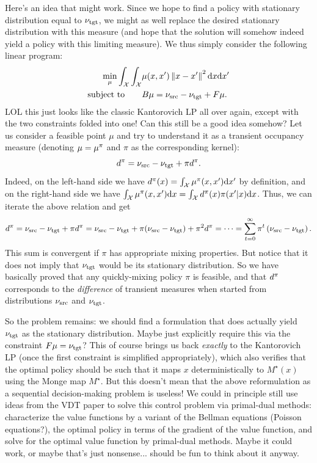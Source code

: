 \documentclass[twoside,10pt]{jmlr}
\begin{document}
Here's an idea that might work. Since we hope to find a policy with stationary distribution equal to $\nu_{\text{tgt}}$, we might 
as well replace the desired stationary distribution with this measure (and hope that the solution will somehow indeed 
yield a policy with this limiting measure). We thus simply consider the following linear program:
\begin{align*}
 \min_{\mu} \int_{\mathcal{X}} \int_{\mathcal{X}} &\mu(x,x') \left\lVert x-x'\right\rVert^2 \mathrm{d} x \mathrm{d} x'
 \\
 \mbox{subject to} \qquad & B\mu = \nu_{\text{src}} - \nu_{\text{tgt}} + F\mu.
\end{align*}
LOL this just looks like the classic Kantorovich LP all over again, except with the two constraints folded into one! 
Can this still be a good idea somehow? Let us consider a feasible point $\mu$ and try to understand it as a transient 
occupancy measure (denoting $\mu = \mu^\pi$ and $\pi$ as the corresponding kernel):
\[
 d^\pi = \nu_{\text{src}} - \nu_{\text{tgt}} + \pi d^\pi.
\]
Indeed, on the left-hand side we have $d^\pi(x) = \int_{\mathcal{X}} \mu^\pi(x,x') \mathrm{d} x'$ by definition, and on the right-hand 
side we have $\int_{\mathcal{X}} \mu^\pi(x,x') \mathrm{d} x = \int_{\mathcal{X}} d^\pi(x) \pi(x'|x) \mathrm{d} x$. Thus, we can iterate the above relation 
and get
\[
 d^\pi = \nu_{\text{src}} - \nu_{\text{tgt}} + \pi d^\pi = \nu_{\text{src}} - \nu_{\text{tgt}} + \pi(\nu_{\text{src}} - \nu_{\text{tgt}}) + \pi^2 d^\pi = \dots = \sum_{t=0}^\infty \pi^t\left(\nu_{\text{src}} - 
\nu_{\text{tgt}}\right).
\]
This sum is convergent if $\pi$ has appropriate mixing properties. But notice that it does not imply that $\nu_{\text{tgt}}$ would 
be its stationary distribution. So we have basically proved that any quickly-mixing policy $\pi$ is feasible, and that 
$d^\pi$ corresponds to the \emph{difference} of transient measures when started from distributions $\nu_{\text{src}}$ and $\nu_{\text{tgt}}$.

So the problem remains: we should find a formulation that does actually yield $\nu_{\text{tgt}}$ as the stationary distribution. 
Maybe just explicitly require this via the constraint $F\mu = \nu_{\text{tgt}}$?  This of course brings us back \emph{exactly} to the 
Kantorovich LP (once the first constraint is simplified appropriately), which also verifies that the optimal policy 
should be such that it maps $x$ deterministically to $M^\star(x)$ using the Monge map $M^\star$. But this doesn't mean 
that the above reformulation as a sequential decision-making problem is useless! We could in principle still use ideas 
from the VDT paper to solve this control problem via primal-dual methods: characterize the value functions by a variant 
of the Bellman equations (Poisson equations?), the optimal policy in terms of the gradient of the value function, and 
solve for the optimal value function by primal-dual methods. Maybe it could work, or maybe that's just nonsense... 
should be fun to think about it anyway.
\end{document}
